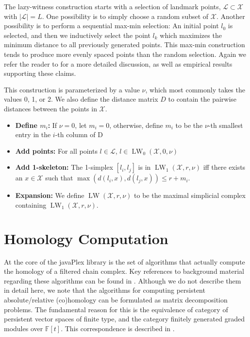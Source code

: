 The lazy-witness construction starts with a selection of landmark points, $\mathcal{L} \subset \mathcal{X}$ with $|\mathcal{L}| = L$. One possibility is to simply choose a random subset of $\mathcal{X}$. Another possibility is to perform a sequential max-min selection: An initial point $l_0$ is selected, and then we inductively select the point $l_k$ which maximizes the minimum distance to all previously generated points. This max-min construction tends to produce more evenly spaced points than the random selection. Again we refer the reader to \cite{Witness} for a more detailed discussion, as well as empirical results supporting these claims.

This construction is parameterized by a value $\nu$, which most commonly takes the values 0, 1, or 2. We also define the distance matrix $D$ to contain the pairwise distances between the points in $\mathcal{X}$. 

\begin{itemize}
\item {\bf Define $m_i$:} If $\nu = 0$, let $m_i = 0$, otherwise, define $m_i$ to be the $\nu$-th smallest entry in the $i$-th column of D
\item {\bf Add points:} For all points $l \in \mathcal{L}$, $l \in \mathop{\mathrm{LW}}_0(\mathcal{X}, 0, \nu)$
\item {\bf Add 1-skeleton:} The 1-simplex $[l_i, l_j]$ is in $\mathop{\mathrm{LW}}_1(\mathcal{X}, r, \nu)$ iff there exists an $x \in \mathcal{X}$ such that $\max(d(l_i, x), d(l_j, x)) \leq r + m_i$.
\item {\bf Expansion:} We define $\mathop{\mathrm{LW}} (\mathcal{X}, r, \nu)$ to be the maximal simplicial complex containing $\mathop{\mathrm{LW}}_1(\mathcal{X}, r, \nu)$. 
\end{itemize}

\section{Homology Computation}

At the core of the javaPlex library is the set of algorithms that actually compute the homology of a filtered chain complex. Key references to background material regarding these algorithms can be found in \cite{Carlsson_04,Dualities}. Although we do not describe them in detail here, we note that the algorithms for computing persistent absolute/relative (co)homology can be formulated as matrix decomposition problems. The fundamental reason for this is the equivalence of category of persistent vector spaces of finite type, and the category finitely generated graded modules over $\mathbb{F}[t]$. This correspondence is described in \cite{Carlsson_04}. 

